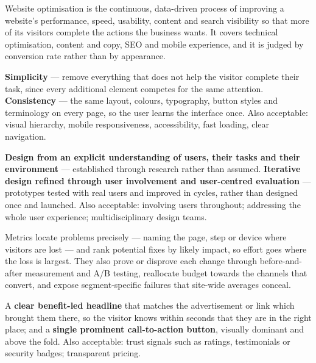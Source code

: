 \begin{qlist}
Website optimisation is the continuous, data-driven process of improving a
website's performance, speed, usability, content and search visibility so that
more of its visitors complete the actions the business wants. It covers
technical optimisation, content and copy, SEO and mobile experience, and it is
judged by conversion rate rather than by appearance.

\textbf{Simplicity} --- remove everything that does not help the visitor
complete their task, since every additional element competes for the same
attention. \textbf{Consistency} --- the same layout, colours, typography,
button styles and terminology on every page, so the user learns the interface
once. Also acceptable: visual hierarchy, mobile responsiveness, accessibility,
fast loading, clear navigation.

\textbf{Design from an explicit understanding of users, their tasks and their
environment} --- established through research rather than assumed.
\textbf{Iterative design refined through user involvement and user-centred
evaluation} --- prototypes tested with real users and improved in cycles, rather
than designed once and launched. Also acceptable: involving users throughout;
addressing the whole user experience; multidisciplinary design teams.

Metrics locate problems precisely --- naming the page, step or device where
visitors are lost --- and rank potential fixes by likely impact, so effort goes
where the loss is largest. They also prove or disprove each change through
before-and-after measurement and A/B testing, reallocate budget towards the
channels that convert, and expose segment-specific failures that site-wide
averages conceal.

A \textbf{clear benefit-led headline} that matches the advertisement or link
which brought them there, so the visitor knows within seconds that they are in
the right place; and a \textbf{single prominent call-to-action button},
visually dominant and above the fold. Also acceptable: trust signals such as
ratings, testimonials or security badges; transparent pricing.


\end{qlist}
